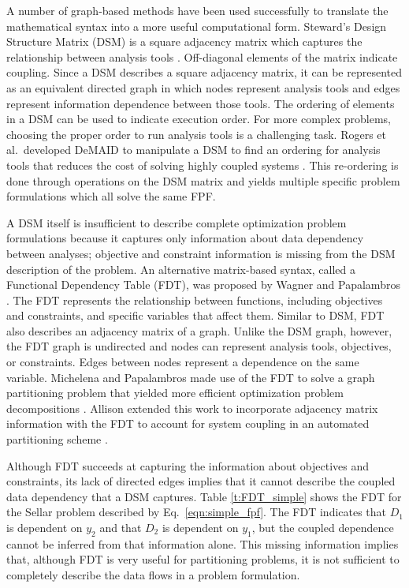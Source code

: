     A number of graph-based methods have been used successfully to translate the
    mathematical syntax into a more useful computational form.
    Steward's Design Structure Matrix (DSM) is a square adjacency matrix which captures the relationship between analysis tools \cite{Steward1981}.
    Off-diagonal elements of the matrix indicate coupling. Since a DSM describes a square adjacency matrix,
    it can be represented as an equivalent directed graph in which nodes represent analysis tools and
    edges represent information dependence between those tools. The ordering of elements in a DSM can be used to indicate
    execution order.  For more complex problems, choosing the proper order to run analysis tools is a challenging task.
    Rogers et al.~developed DeMAID to manipulate a DSM to find an ordering for analysis tools that
    reduces the cost of solving highly coupled systems \cite{rogers1996,rogers1996demaid}. This re-ordering is done through
    operations on the DSM matrix and yields multiple specific problem
    formulations which all solve the same FPF.

    A DSM itself is insufficient to describe complete optimization problem formulations because it
    captures only information about data dependency between analyses; objective and
    constraint information is missing from the DSM description of the problem.
    An alternative matrix-based syntax, called a Functional Dependency Table (FDT), was proposed by Wagner and Papalambros \cite{Wagner1993}.
    The FDT represents the relationship between functions, including objectives and constraints, and specific variables that affect
    them. Similar to DSM, FDT also describes an adjacency matrix of a graph. Unlike the DSM graph,
    however, the FDT graph is undirected and nodes can represent analysis tools, objectives,
    or constraints. Edges between nodes represent a dependence on the same
    variable. Michelena and Papalambros made use of the FDT to solve a graph partitioning problem that yielded
    more efficient optimization problem decompositions \cite{Michelena1997}. Allison
    extended this work to incorporate adjacency matrix information with the FDT to
    account for system coupling in an automated partitioning scheme \cite{Allison2008}.

    Although FDT succeeds at capturing the
    information about objectives and constraints, its lack of directed edges
    implies that it cannot describe the coupled data dependency that a DSM captures.
    Table \ref{t:FDT_simple}  shows the FDT for the Sellar problem described by Eq.~\ref{eqn:simple_fpf}.
    The FDT indicates that $D_1$ is dependent on $y_2$ and
    that $D_2$ is dependent on $y_1$, but the coupled dependence cannot be inferred from
    that information alone. This missing information implies
    that, although FDT is very useful for partitioning problems, it is not
    sufficient to completely describe the data flows in a problem formulation.

